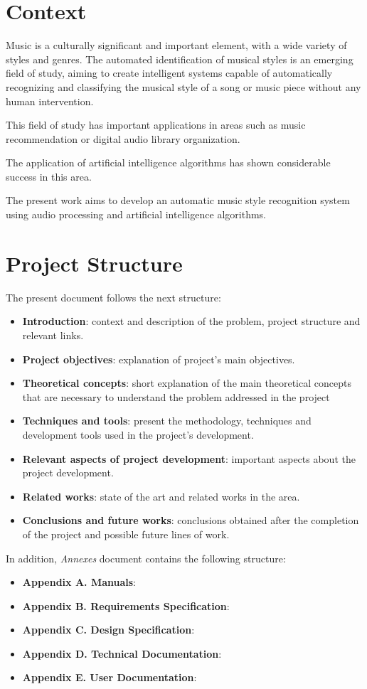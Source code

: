 
\section{Context}
Music is a culturally significant and important element, with a wide variety of styles and genres.
The automated identification of musical styles is an emerging field of study, aiming to create intelligent systems capable of automatically recognizing and classifying the musical style of a song or music piece without any human intervention.

This field of study has important applications in areas such as music recommendation or digital audio library organization.

The application of artificial intelligence algorithms has shown considerable success in this area.

The present work aims to develop an automatic music style recognition system using audio processing and artificial intelligence algorithms.

\section{Project Structure}
The present document follows the next structure:

\begin{itemize}
\item \textbf{Introduction}: context and description of the problem,  project structure and relevant links.
\item \textbf{Project objectives}: explanation of project's main objectives.
\item \textbf{Theoretical concepts}: short explanation of the main theoretical concepts that are necessary to understand the problem addressed in the project
\item \textbf{Techniques and tools}: present the methodology, techniques and development tools used in the project's development.
\item \textbf{Relevant aspects of project development}: important aspects about the project development.
\item \textbf{Related works}: state of the art and related works in the area.
\item \textbf{Conclusions and future works}: conclusions obtained after the completion of the project and possible future lines of work.
\end{itemize}

In addition, \textit{Annexes} document contains the following structure:

\begin{itemize}
\item \textbf{Appendix A. Manuals}:
\item \textbf{Appendix B. Requirements Specification}:
\item \textbf{Appendix C. Design Specification}:
\item \textbf{Appendix D. Technical Documentation}:
\item \textbf{Appendix E. User Documentation}:
\end{itemize}